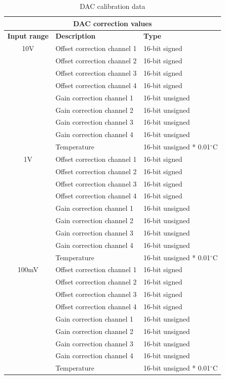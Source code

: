 \documentclass[11pt,a4paper]{article}
\begin{document}
\begin{table}[ht]
  \centering
  \begin{tabularx}{\textwidth}{|c|l|X|}
    \hline
    \multicolumn{3}{|c|}{\textbf{DAC correction values}} \\ \hline
    \textbf{Input range}  & \textbf{Description} & \textbf{Type} \\ \hline
    10V & Offset correction channel 1 & 16-bit signed \\
    & Offset correction channel 2 & 16-bit signed \\
    & Offset correction channel 3 & 16-bit signed \\
    & Offset correction channel 4 & 16-bit signed \\
    \cline{2-3}
    & Gain correction channel 1 & 16-bit unsigned \\
    & Gain correction channel 2 & 16-bit unsigned \\
    & Gain correction channel 3 & 16-bit unsigned \\
    & Gain correction channel 4 & 16-bit unsigned \\
    \cline{2-3}
    & Temperature & 16-bit unsigned * 0.01$^\circ$C \\
    \hline
    1V & Offset correction channel 1 & 16-bit signed \\
    & Offset correction channel 2 & 16-bit signed \\
    & Offset correction channel 3 & 16-bit signed \\
    & Offset correction channel 4 & 16-bit signed \\
    \cline{2-3}
    & Gain correction channel 1 & 16-bit unsigned \\
    & Gain correction channel 2 & 16-bit unsigned \\
    & Gain correction channel 3 & 16-bit unsigned \\
    & Gain correction channel 4 & 16-bit unsigned \\
    \cline{2-3}
    & Temperature & 16-bit unsigned * 0.01$^\circ$C \\
    \hline
    100mV & Offset correction channel 1 & 16-bit signed \\
    & Offset correction channel 2 & 16-bit signed \\
    & Offset correction channel 3 & 16-bit signed \\
    & Offset correction channel 4 & 16-bit signed \\
    \cline{2-3}
    & Gain correction channel 1 & 16-bit unsigned \\
    & Gain correction channel 2 & 16-bit unsigned \\
    & Gain correction channel 3 & 16-bit unsigned \\
    & Gain correction channel 4 & 16-bit unsigned \\
    \cline{2-3}
    & Temperature & 16-bit unsigned * 0.01$^\circ$C \\
    \hline
  \end{tabularx}
  \caption{DAC calibration data}
  \label{tab:dac_calibr_data_eeprom}
\end{table}
\end{document}
